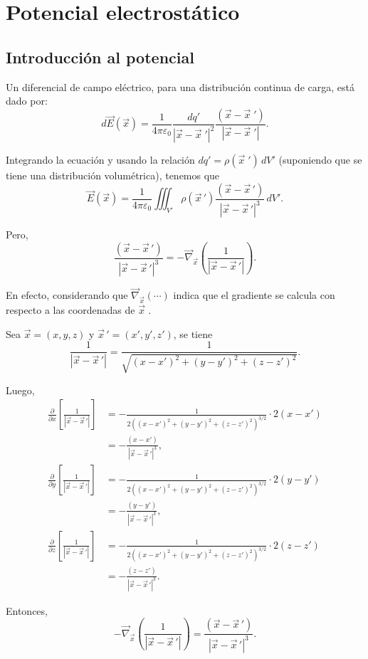 \chapter{Potencial electrostático}

\section{Introducción al potencial}

Un diferencial de  campo eléctrico, para una distribución continua de carga, está dado por:
$$d\vec{E}(\vec{x}) = \frac{1}{4\pi\varepsilon_0} \frac{dq'}{|\vec{x} - \vec{x}\;'|^2} \frac{(\vec{x} - \vec{x}\;')}{ |\vec{x} - \vec{x}\;'|}.$$

Integrando la ecuación y usando la relación $dq' = \rho(\vec{x}\;') \,dV' $ (suponiendo que se tiene una distribución volumétrica), tenemos que
$$\vec{E}(\Vec{x}) = \frac{1}{4\pi\varepsilon_0} \iiint_{V'} \rho(\vec{x}\,') \frac{(\vec{x} - \vec{x}\,')}{|\vec{x} - \vec{x}\,'|^3}\,dV'.$$

Pero,
\begin{equation}
 \frac{(\vec{x} - \vec{x}\,')}{|\vec{x} - \vec{x}\,'|^3} = - \vec{\nabla}_{\vec{x}} \left( \frac{1}{|\vec{x} - \vec{x}\,'|} \right).   \label{Identidad-Grad}
\end{equation}

\begin{demo}
En efecto, considerando que $ \vec{\nabla}_{\vec{x}} (\cdots) $ indica que el gradiente se calcula con respecto a las coordenadas de $ \vec{x} $ .

Sea $\vec{x} = (x,y,z)$ y $\vec{x}\,' = (x',y',z')$, se tiene
$$\frac{1}{|\vec{x} - \vec{x}\,'|} = \frac{1}{\sqrt{(x-x')^2 + (y-y')^2 + (z-z')^2}}.$$

Luego,
\begin{align*}
   \frac{\partial }{\partial x} \left[ \frac{1}{|\vec{x} - \vec{x}\,'|} \right] &= -\frac{1}{2 ((x-x')^2 + (y-y')^2 + (z-z')^2)^{3/2}} \cdot 2(x-x') \\
&= - \frac{(x-x')}{|\vec{x} - \vec{x}\,'|^3}, \\
\frac{\partial }{\partial y} \left[ \frac{1}{|\vec{x} - \vec{x}\,'|} \right] &= -\frac{1}{2 ((x-x')^2 + (y-y')^2 + (z-z')^2)^{3/2}} \cdot 2(y-y') \\ 
&= - \frac{(y-y')}{|\vec{x} - \vec{x}\,'|^3}, \\
\frac{\partial }{\partial z} \left[ \frac{1}{|\vec{x} - \vec{x}\,'|} \right] &= -\frac{1}{2 ((x-x')^2 + (y-y')^2 + (z-z')^2)^{3/2}} \cdot 2(z-z') \\ 
&= - \frac{(z-z')}{|\vec{x} - \vec{x}\,'|^3}. 
\end{align*}

Entonces,
$$ - \vec{\nabla}_{\vec{x}} \left( \frac{1}{|\vec{x} - \vec{x}\,'|} \right) = \frac{(\vec{x} - \vec{x}\,')}{|\vec{x} - \vec{x}\,'|^3} .$$
\end{demo}

